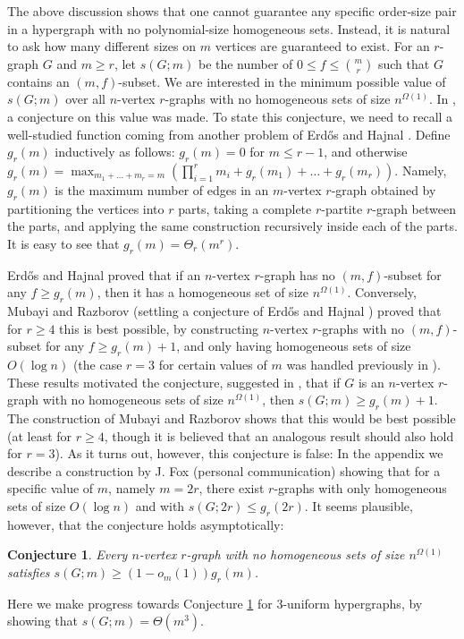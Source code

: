 \documentclass[11pt]{article}
\theoremstyle{plain}
\newtheorem{conjecture}[theorem]{Conjecture}
\begin{document}
The above discussion shows that one cannot guarantee any specific order-size pair in a hypergraph with no polynomial-size homogeneous sets. Instead, it is natural to ask how many different sizes on $m$ vertices are guaranteed to exist. For an $r$-graph $G$ and $m \geq r$, let $s(G;m)$ be the number of $0 \leq f \leq \binom{m}{r}$ such that $G$ contains an $(m,f)$-subset. 
We are interested in the minimum possible value of $s(G;m)$ over all $n$-vertex $r$-graphs with no homogeneous sets of size $n^{\Omega(1)}$. 
In \cite{ABGMW}, a conjecture on this value was made. To state this conjecture, we need to recall a well-studied function coming from another problem of Erd\H{o}s and Hajnal \cite{EH_offdiagonal}. Define $g_r(m)$ inductively as follows: $g_r(m) = 0$ for $m \leq r-1$, and otherwise 
$g_r(m) = \max_{m_1 + \dots + m_r = m} \left( \prod_{i=1}^r m_i + g_r(m_1) + \dots + g_r(m_r) \right)$. Namely, $g_r(m)$ is the maximum number of edges in an $m$-vertex $r$-graph obtained by partitioning the vertices into $r$ parts, taking a complete $r$-partite $r$-graph between the parts, and applying the same construction recursively inside each of the parts. It is easy to see that $g_r(m) = \Theta_r(m^r)$.

Erd\H{o}s and Hajnal \cite{EH_offdiagonal} proved that if an $n$-vertex $r$-graph has no $(m,f)$-subset for any $f \geq g_r(m)$, then it has a homogeneous set of size $n^{\Omega(1)}$. Conversely, Mubayi and Razborov \cite{MR} (settling a conjecture of Erd\H{o}s and Hajnal \cite{EH_offdiagonal}) proved that for $r \geq 4$ this is best possible, by constructing $n$-vertex $r$-graphs with no $(m,f)$-subset for any $f \geq g_r(m)+1$, and only having homogeneous sets of size $O(\log n)$ (the case $r=3$ for certain values of $m$ was handled previously in \cite{CFS_hyperRamsey}). These results motivated the conjecture, suggested in \cite{ABGMW}, that if $G$ is an $n$-vertex $r$-graph with no homogeneous sets of size $n^{\Omega(1)}$, then $s(G;m) \geq g_r(m)+1$. The construction of Mubayi and Razborov shows that this would be best possible (at least for $r \geq 4$, though it is believed that an analogous result should also hold for $r=3$). 
As it turns out, however, this conjecture is false: In the appendix we describe a construction by J. Fox (personal communication) showing that for a specific value of $m$, namely $m = 2r$, there exist $r$-graphs with only homogeneous sets of size $O(\log n)$ and with $s(G;2r) \leq g_r(2r)$. It seems plausible, however, that the conjecture holds asymptotically:
\begin{conjecture}\label{conj:many sizes}
    Every $n$-vertex $r$-graph with no homogeneous sets of size $n^{\Omega(1)}$ satisfies $s(G;m) \geq (1-o_m(1))g_r(m)$.
\end{conjecture}
\noindent
Here we make progress towards Conjecture \ref{conj:many sizes} for $3$-uniform hypergraphs, by showing that $s(G;m) = \Theta(m^3)$. 
\end{document}
